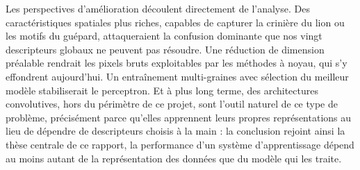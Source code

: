 \documentclass[11pt,a4paper]{report}
\begin{document}
Les perspectives d'amélioration découlent directement de l'analyse. Des
caractéristiques spatiales plus riches, capables de capturer la crinière
du lion ou les motifs du guépard, attaqueraient la confusion dominante
que nos vingt descripteurs globaux ne peuvent pas résoudre. Une
réduction de dimension préalable rendrait les pixels bruts exploitables
par les méthodes à noyau, qui s'y effondrent aujourd'hui. Un
entraînement multi-graines avec sélection du meilleur modèle
stabiliserait le perceptron. Et à plus long terme, des architectures
convolutives, hors du périmètre de ce projet, sont l'outil naturel de ce
type de problème, précisément parce qu'elles apprennent leurs propres
représentations au lieu de dépendre de descripteurs choisis à la main :
la conclusion rejoint ainsi la thèse centrale de ce rapport, la
performance d'un système d'apprentissage dépend au moins autant de la
représentation des données que du modèle qui les traite.
\end{document}
